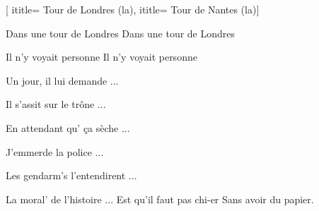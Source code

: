  [
ititle= {Tour de Londres (la)},
ititle= {Tour de Nantes (la)}]


\beginverse
Dans une tour de Londres
Dans une tour de Londres
\endverse

\beginverse
Il n'y voyait personne
Il n'y voyait personne
\endverse

\beginverse
Un jour, il lui demande ...
\endverse

\beginverse
Il s'assit sur le trône ...
\endverse

\beginverse
En attendant qu' ça sèche ...
\endverse

\beginverse
J'emmerde la police ...
\endverse

\beginverse
Les gendarm's l'entendirent ...
\endverse

\beginverse
La moral' de l'histoire ...
Est qu'il faut pas chi-er
Sans avoir du papier.
\endverse

\endsong